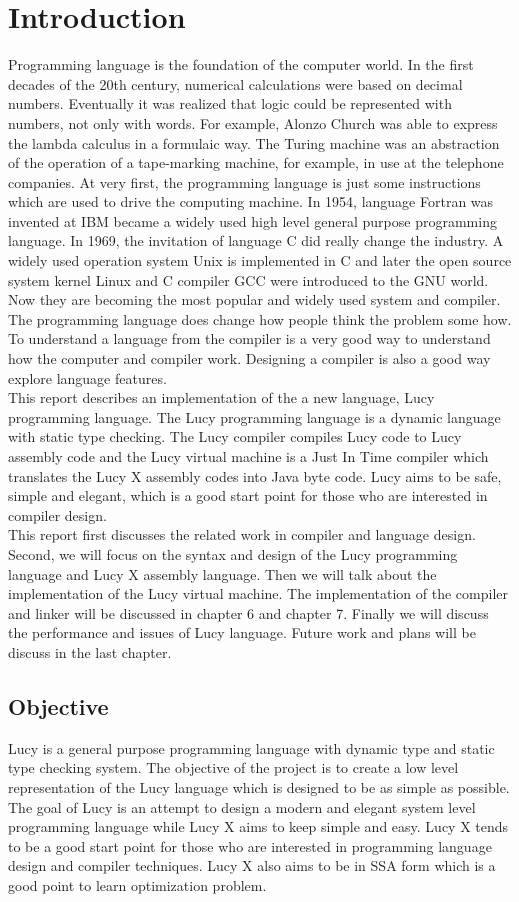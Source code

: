 \chapter{Introduction}
Programming language is the foundation of the computer world. In the first decades of the 20th century, numerical calculations were based on decimal numbers. Eventually it was realized that logic could be represented with numbers, not only with words. For example, Alonzo Church was able to express the lambda calculus in a formulaic way. The Turing machine was an abstraction of the operation of a tape-marking machine, for example, in use at the telephone companies. At very first, the programming language is just some instructions which are used to drive the computing machine. In 1954, language Fortran was invented at IBM became a widely used high level general purpose programming language. In 1969, the invitation of language C did really change the industry. A widely used operation system Unix is implemented in C and later the open source system kernel Linux and C compiler GCC were introduced to the GNU world. Now they are becoming the most popular and widely used system and compiler. \\
The programming language does change how people think the problem some how. To understand a language from the compiler is a very good way to understand how the computer and compiler work. Designing a compiler is also a good way explore language features. \\
This report describes an implementation of the a new language, Lucy programming language. The Lucy programming language is a dynamic language with static type checking. The Lucy compiler compiles Lucy code to Lucy assembly code and the Lucy virtual machine is a Just In Time compiler which translates the Lucy X assembly codes into Java byte code. Lucy aims to be safe, simple and elegant, which is a good start point for those who are interested in compiler design. \\
This report first discusses the related work in compiler and language design. Second, we will focus on the syntax and design of the Lucy programming language and Lucy X assembly language. Then we will talk about the implementation of the Lucy virtual machine. The implementation of the compiler and linker will be discussed in chapter 6 and chapter 7. Finally we will discuss the performance and issues of Lucy language. Future work and plans will be discuss in the last chapter.


\section{Objective}
Lucy is a general purpose programming language with dynamic type and static type checking system. The objective of the project is to create a low level representation of the Lucy language which is designed to be as simple as possible. The goal of Lucy is an attempt to design a modern and elegant system level programming language while Lucy X aims to keep simple and easy. Lucy X tends to be a good start point for those who are interested in programming language design and compiler techniques. Lucy X also aims to be in SSA form which is a good point to learn optimization problem.


